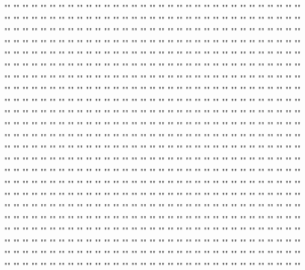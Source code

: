 ""	""	""
""	""	""
""	""	""
""	""	""
""	""	""
""	""	""
""	""	""
""	""	""
""	""	""
""	""	""
""	""	""
""	""	""
""	""	""
""	""	""
""	""	""
""	""	""
""	""	""
""	""	""
""	""	""
""	""	""
""	""	""
""	""	""
""	""	""
""	""	""
""	""	""
""	""	""
""	""	""
""	""	""
""	""	""
""	""	""
""	""	""
""	""	""
""	""	""
""	""	""
""	""	""
""	""	""
""	""	""
""	""	""
""	""	""
""	""	""
""	""	""
""	""	""
""	""	""
""	""	""
""	""	""
""	""	""
""	""	""
""	""	""
""	""	""
""	""	""
""	""	""
""	""	""
""	""	""
""	""	""
""	""	""
""	""	""
""	""	""
""	""	""
""	""	""
""	""	""
""	""	""
""	""	""
""	""	""
""	""	""
""	""	""
""	""	""
""	""	""
""	""	""
""	""	""
""	""	""
""	""	""
""	""	""
""	""	""
""	""	""
""	""	""
""	""	""
""	""	""
""	""	""
""	""	""
""	""	""
""	""	""
""	""	""
""	""	""
""	""	""
""	""	""
""	""	""
""	""	""
""	""	""
""	""	""
""	""	""
""	""	""
""	""	""
""	""	""
""	""	""
""	""	""
""	""	""
""	""	""
""	""	""
""	""	""
""	""	""
""	""	""
""	""	""
""	""	""
""	""	""
""	""	""
""	""	""
""	""	""
""	""	""
""	""	""
""	""	""
""	""	""
""	""	""
""	""	""
""	""	""
""	""	""
""	""	""
""	""	""
""	""	""
""	""	""
""	""	""
""	""	""
""	""	""
""	""	""
""	""	""
""	""	""
""	""	""
""	""	""
""	""	""
""	""	""
""	""	""
""	""	""
""	""	""
""	""	""
""	""	""
""	""	""
""	""	""
""	""	""
""	""	""
""	""	""
""	""	""
""	""	""
""	""	""
""	""	""
""	""	""
""	""	""
""	""	""
""	""	""
""	""	""
""	""	""
""	""	""
""	""	""
""	""	""
""	""	""
""	""	""
""	""	""
""	""	""
""	""	""
""	""	""
""	""	""
""	""	""
""	""	""
""	""	""
""	""	""
""	""	""
""	""	""
""	""	""
""	""	""
""	""	""
""	""	""
""	""	""
""	""	""
""	""	""
""	""	""
""	""	""
""	""	""
""	""	""
""	""	""
""	""	""
""	""	""
""	""	""
""	""	""
""	""	""
""	""	""
""	""	""
""	""	""
""	""	""
""	""	""
""	""	""
""	""	""
""	""	""
""	""	""
""	""	""
""	""	""
""	""	""
""	""	""
""	""	""
""	""	""
""	""	""
""	""	""
""	""	""
""	""	""
""	""	""
""	""	""
""	""	""
""	""	""
""	""	""
""	""	""
""	""	""
""	""	""
""	""	""
""	""	""
""	""	""
""	""	""
""	""	""
""	""	""
""	""	""
""	""	""
""	""	""
""	""	""
""	""	""
""	""	""
""	""	""
""	""	""
""	""	""
""	""	""
""	""	""
""	""	""
""	""	""
""	""	""
""	""	""
""	""	""
""	""	""
""	""	""
""	""	""
""	""	""
""	""	""
""	""	""
""	""	""
""	""	""
""	""	""
""	""	""
""	""	""
""	""	""
""	""	""
""	""	""
""	""	""
""	""	""
""	""	""
""	""	""
""	""	""
""	""	""
""	""	""
""	""	""
